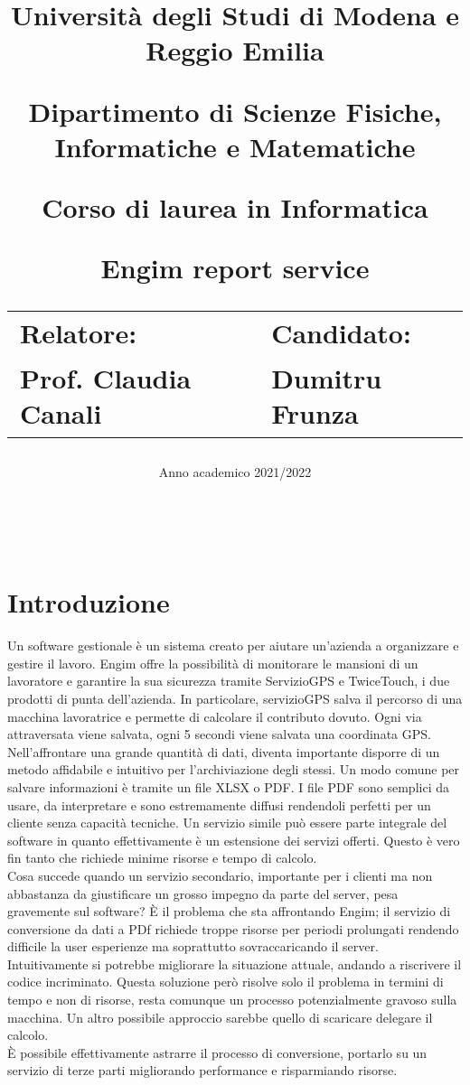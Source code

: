 \documentclass[12pt]{article}
\author{}
\title{
    \huge 
        \textbf{Università degli Studi di Modena e Reggio Emilia}
    \large
        \par Dipartimento di Scienze Fisiche, Informatiche e Matematiche
        \par Corso di laurea in Informatica
    \vfil
        \huge \par \textbf{Engim report service}
    \vfil
    \normalsize
    \begin{tabular}{lp{0.4\textwidth}l}
      Relatore: & & Candidato: \\
      Prof. Claudia Canali & &  Dumitru Frunza \\
      \end{tabular}
}
\date{Anno academico 2021/2022}
\begin{document}
\maketitle
\thispagestyle{empty}
\newpage 
\thispagestyle{empty}
\
\newpage
{}
\addtocounter{page}{0}
\listoffigures
\newpage
{}
\tableofcontents
{}
\newpage
{}
\addtocounter{page}{0}


\section*{Introduzione}
Un software gestionale è un sistema creato per aiutare un'azienda a organizzare 
e gestire il lavoro.
Engim offre la possibilità di monitorare le mansioni di un lavoratore e garantire 
la sua sicurezza tramite  ServizioGPS e TwiceTouch, i due prodotti di punta dell'azienda. 
In particolare, servizioGPS salva il percorso di una macchina lavoratrice e 
permette di calcolare il contributo dovuto. Ogni via attraversata viene salvata, 
ogni 5 secondi viene salvata una coordinata GPS.
\\ Nell'affrontare una grande quantità di dati, diventa importante
 disporre di un metodo affidabile e intuitivo per l'archiviazione degli stessi.
Un modo comune per salvare informazioni è tramite un file XLSX o PDF.
I file PDF sono semplici da usare, da interpretare e sono estremamente diffusi 
rendendoli perfetti per un cliente senza capacità tecniche. 
Un servizio simile può essere parte integrale del software in quanto effettivamente 
è un estensione dei servizi offerti. 
Questo è vero fin tanto che richiede minime risorse e tempo di calcolo.
\\ Cosa succede quando un servizio secondario, importante per i clienti ma non 
abbastanza da giustificare un grosso impegno da parte del server, pesa gravemente 
sul software? 
È il problema che sta affrontando Engim; il servizio di conversione da dati 
a PDf richiede troppe risorse per periodi prolungati rendendo difficile la user 
esperienze ma soprattutto sovraccaricando il server.
Intuitivamente si potrebbe migliorare la situazione attuale, andando a riscrivere 
il codice incriminato.
Questa soluzione però risolve solo il problema in termini di tempo e non di 
risorse, resta comunque un processo potenzialmente gravoso sulla macchina. 
Un altro possibile approccio sarebbe quello di scaricare delegare il calcolo.
\\ È possibile effettivamente astrarre il processo di conversione, portarlo su 
un servizio di terze parti migliorando performance e risparmiando risorse.
\end{document}
